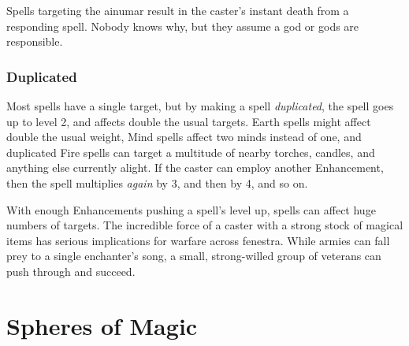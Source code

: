 \begin{multicols}{2}
Spells targeting the \gls{ainumar} result in the caster's instant death from a responding spell.
Nobody knows why, but they assume a god or gods are responsible.

\subsubsection{Duplicated}

Most spells have a single target, but by making a spell \textit{duplicated}, the spell goes up to level 2, and affects double the usual targets.
Earth spells might affect double the usual \gls{weight}, Mind spells affect two minds instead of one, and duplicated Fire spells can target a multitude of nearby torches, candles, and anything else currently alight.
If the caster can employ another Enhancement, then the spell multiplies \emph{again} by 3, and then by 4, and so on.


With enough Enhancements pushing a spell's level up, spells can affect huge numbers of targets.
The incredible force of a caster with a strong stock of magical items has serious implications for warfare across \gls{fenestra}.
While armies can fall prey to a single enchanter's song, a small, strong-willed group of veterans can push through and succeed.

\end{multicols}

\section{Spheres of Magic}

